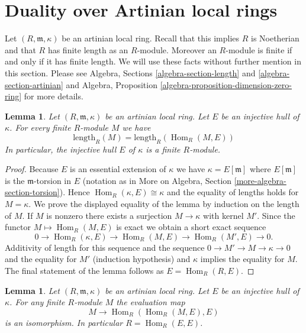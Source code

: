 \documentclass{stacks-project}
\theoremstyle{plain}
\newtheorem{lemma}[subsection]{Lemma}
\theoremstyle{definition}
\theoremstyle{remark}
\numberwithin{equation}{subsection}
\def\Hom{\mathop{\mathrm{Hom}}\nolimits}
\begin{document}
\section{Duality over Artinian local rings}
\label{section-artinian}

\noindent
Let $(R, \mathfrak m, \kappa)$ be an artinian local ring.
Recall that this implies $R$ is Noetherian and that $R$ has finite
length as an $R$-module. Moreover an $R$-module is finite if and
only if it has finite length. We will use these facts without
further mention in this section. Please see
Algebra, Sections \ref{algebra-section-length} and
\ref{algebra-section-artinian}
and
Algebra, Proposition \ref{algebra-proposition-dimension-zero-ring}
for more details.

\begin{lemma}
\label{lemma-finite}
Let $(R, \mathfrak m, \kappa)$ be an artinian local ring.
Let $E$ be an injective hull of $\kappa$. For every finite
$R$-module $M$ we have
$$
\text{length}_R(M) = \text{length}_R(\Hom_R(M, E))
$$
In particular, the injective hull $E$ of $\kappa$ is a finite $R$-module.
\end{lemma}

\begin{proof}
Because $E$ is an essential extension of $\kappa$ we have
$\kappa = E[\mathfrak m]$ where $E[\mathfrak m]$ is the
$\mathfrak m$-torsion in $E$ (notation as in More on Algebra, Section
\ref{more-algebra-section-torsion}).
Hence $\Hom_R(\kappa, E) \cong \kappa$ and the equality of lengths
holds for $M = \kappa$. We prove the displayed equality of the lemma
by induction on the length of $M$. If $M$ is nonzero there exists a surjection
$M \to \kappa$ with kernel $M'$. Since the functor $M \mapsto \Hom_R(M, E)$
is exact we obtain a short exact sequence
$$
0 \to \Hom_R(\kappa, E) \to \Hom_R(M, E) \to \Hom_R(M', E) \to 0.
$$
Additivity of length for this sequence and the sequence
$0 \to M' \to M \to \kappa \to 0$ and the equality for $M'$ (induction
hypothesis) and $\kappa$ implies the equality for $M$.
The final statement of the lemma follows as $E = \Hom_R(R, E)$.
\end{proof}

\begin{lemma}
\label{lemma-evaluate}
Let $(R, \mathfrak m, \kappa)$ be an artinian local ring.
Let $E$ be an injective hull of $\kappa$.
For any finite $R$-module $M$ the evaluation map
$$
M \longrightarrow \Hom_R(\Hom_R(M, E), E)
$$
is an isomorphism. In particular $R = \Hom_R(E, E)$.
\end{lemma}
\end{document}
